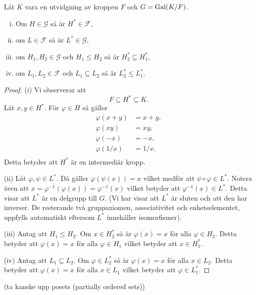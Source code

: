 \documentclass{article}
\newcommand{\gal}[0]{\textnormal{Gal}}
\theoremstyle{definition}
\begin{document}
\hypertarget{lemma9.0.1}{}
\begin{mylemma}{}{}
  Låt $K$ vara en utvidgning av kroppen $F$ och $G = \gal(K/F)$.
  \begin{enumerate}[(i)]
    \item Om $H \in \mathcal{G}$ så är $H^* \in \mathcal{F}$,
    \item om $L \in \mathcal{F}$ så är $L^* \in \mathcal{G}$,
    \item om $H_1, H_2 \in \mathcal{G}$ och $H_1 \leq H_2$ så är $H_2^* \subseteq H_1^*$,
    \item om $L_1, L_2 \in \mathcal{F}$ och $L_1 \subseteq L_2$ så är $L_2^* \leq L_1^*$.
  \end{enumerate}
\end{mylemma}

\begin{proof}
  (i) Vi observerar att 
  \[F \subseteq H^* \subseteq K.\]
  Låt $x, y \in H^*$. För $\varphi \in H$ så gäller 
  \begin{align*}
    \varphi(x + y) &= x + y, \\
    \varphi(xy) &= xy, \\
    \varphi(-x) &= -x, \\
    \varphi(1/x) &= 1/x. \\
  \end{align*}
  Detta betyder att $H^*$ är en intermediär kropp.

  (ii) Låt $\varphi, \psi \in L^*$. Då gäller $\varphi(\psi(x)) = x$ vilket medför att $\psi \circ \varphi \in L^*$. 
  Notera även att $x = \varphi^{-1}(\varphi(x)) = \varphi^{-1}(x)$ vilket betyder att $\varphi^{-1}(x) \in L^*$. Detta visar att $L^*$ är en delgrupp till $G$.
  (Vi har visar att $L^*$ är sluten och att den har inverser. De resterande två gruppaxiomen, associativitet och enhetselementet, uppfylls automatiskt
  eftersom $L^*$ innehåller isomorfismer).

  (iii) Antag att $H_1 \leq H_2$. Om $x \in H_2^*$ så är $\varphi(x) = x$ för alla $\varphi \in H_2.$ Detta betyder att $\varphi(x) = x$ för alla $\varphi \in H_1$
  vilket betyder att $x \in H_1^*.$

  (iv) Antag att $L_1 \subseteq L_2$. Om $\varphi \in L_2^*$ så är $\varphi(x) = x$ för alla $x \in L_2$. Detta betyder att $\varphi(x) = x$ för alla $x \in L_1$
  vilket betyder att $\varphi \in L_1^*.$
\end{proof}

(ta kanske upp posets (partially ordered sets))
\end{document}
